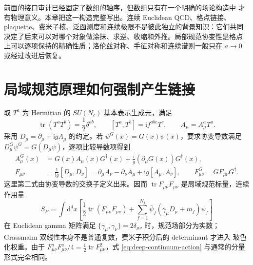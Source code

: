 \documentclass[UTF8,11pt,oneside]{ctexbook}
\newcommand{\dd}{\mathrm{d}}
\begin{document}
前面的接口审计已经固定了数组的轴序，但数组只有在一个明确的场论构造中
才有物理意义。本章把这一构造完整写出。连续 Euclidean QCD、格点链接、
plaquette、费米子核、泛函测度和连续极限不是彼此独立的背景知识：它们共同
决定了后来可以对哪个对象做涂抹、求逆、收缩和外推。局部规范协变性是格点
上可以逐项保持的精确性质；洛伦兹对称、手征对称和连续谱则一般只在
\(a\to0\) 或经过改进后恢复。

\section{局域规范原理如何强制产生链接}

取 \(T^a\) 为 Hermitian 的 \(SU(N_c)\) 基本表示生成元，满足
\begin{equation}
 \operatorname{tr}(T^aT^b)=\frac12\delta^{ab},
 \qquad [T^a,T^b]=\mathrm{i}f^{abc}T^c,
 \qquad A_\mu=A_\mu^aT^a .
 \label{eq:deep-suN-convention}
\end{equation}
采用 \(D_\mu=\partial_\mu+\mathrm{i}gA_\mu\) 的约定。若
\(\psi^G(x)=G(x)\psi(x)\)，要求协变导数满足
\(D_\mu^G\psi^G=G(D_\mu\psi)\)，逐项比较导数项得到
\begin{align}
 A_\mu^G(x)
 &=G(x)A_\mu(x)G^\dagger(x)
   +\frac{\mathrm{i}}{g}(\partial_\mu G(x))G^\dagger(x),
 \label{eq:deep-gauge-transform}\\
 F_{\mu\nu}
 &=\frac{1}{\mathrm{i}g}[D_\mu,D_\nu]
 =\partial_\mu A_\nu-\partial_\nu A_\mu
  +\mathrm{i}g[A_\mu,A_\nu],
 \qquad F_{\mu\nu}^G=GF_{\mu\nu}G^\dagger .
 \label{eq:deep-field-strength}
\end{align}
这里第二式由协变导数的交换子定义出来。因而
\(\operatorname{tr}F_{\mu\nu}F_{\mu\nu}\) 是局域规范标量，连续作用量
\begin{equation}
 S_E=\int\dd^4x\left[
 \frac12\operatorname{tr}(F_{\mu\nu}F_{\mu\nu})
 +\sum_{f=1}^{N_f}\bar\psi_f(\gamma_\mu D_\mu+m_f)\psi_f\right]
 \label{eq:deep-continuum-action}
\end{equation}
在 Euclidean gamma 矩阵满足
\(\{\gamma_\mu,\gamma_\nu\}=2\delta_{\mu\nu}\) 时，规范场部分为实数；
Grassmann 双线性本身不是普通复数，费米子积分后的 determinant 才进入
玻色化权重。由于
\(F^a_{\mu\nu}F^a_{\mu\nu}/4=\frac12\operatorname{tr}F_{\mu\nu}^2\)，式
\eqref{eq:deep-continuum-action} 与通常的分量形式完全相同。
\end{document}
